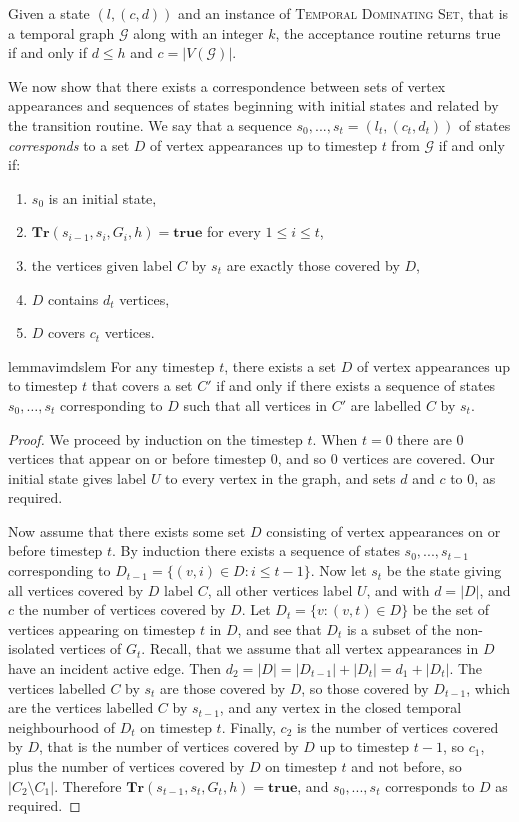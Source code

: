 \documentclass[a4paper,UKenglish,cleveref, autoref, thm-restate]{lipics-v2021} %
\begin{document}
\begin{toappendix}
Given a state $(l, (c, d))$ and an instance of \textsc{Temporal Dominating Set}, that is a temporal graph $\mathcal{G}$ along with an integer $k$, the acceptance routine returns true if and only if $d \leq h$ and $c = |V(\mathcal{G})|$.

We now show that there exists a correspondence between sets of vertex appearances and sequences of states beginning with initial states and related by the transition routine. We say that a sequence $s_0, ..., s_t = (l_t,(c_t,d_t))$ of states \textit{corresponds} to a set $D$ of vertex appearances up to timestep $t$ from $\mathcal{G}$ if and only if:
 \begin{enumerate}
     \item $s_0$ is an initial state,
     \item $\textbf{Tr}(s_{i-1}, s_i, G_i,h)=\textbf{true}$ for every $1 \leq i \leq t$,
     \item the vertices given label $C$ by $s_t$ are exactly those covered by $D$,
     \item $D$ contains $d_t$ vertices,
     \item $D$ covers $c_t$ vertices.
 \end{enumerate}

 \begin{restatable}{lemma}{vimdslem}
     For any timestep $t$, there exists a set $D$ of vertex appearances up to timestep $t$ that covers a set $C'$ if and only if there exists a sequence of states $s_0,\ldots,s_t$ corresponding to $D$ such that all vertices in $C'$ are labelled $C$ by $s_t$.
 \end{restatable}
 \begin{proof}
     We proceed by induction on the timestep $t$. When $t=0$ there are $0$ vertices that appear on or before timestep $0$, and so $0$ vertices are covered. Our initial state gives label $U$ to every vertex in the graph, and sets $d$ and $c$ to $0$, as required.

     Now assume that there exists some set $D$ consisting of vertex appearances on or before timestep $t$. By induction there exists a sequence of states $s_0, ..., s_{t-1}$ corresponding to $D_{t-1} = \{(v, i) \in D : i \leq t - 1\}$. Now let $s_t$ be the state giving all vertices covered by $D$ label $C$, all other vertices label $U$, and with $d = |D|$, and $c$ the number of vertices covered by $D$. Let $D_t = \{v : (v, t) \in D\}$ be the set of vertices appearing on timestep $t$ in $D$, and see that $D_t$ is a subset of the non-isolated vertices of $G_t$. Recall, that we assume that all vertex appearances in $D$ have an incident active edge. Then $d_2 = |D| = |D_{t-1}|+|D_t| = d_1+|D_t|$. The vertices labelled $C$ by $s_t$ are those covered by $D$, so those covered by $D_{t-1}$, which are the vertices labelled $C$ by $s_{t-1}$, and any vertex in the closed temporal neighbourhood of $D_t$ on timestep $t$. Finally, $c_2$ is the number of vertices covered by $D$, that is the number of vertices covered by $D$ up to timestep $t-1$, so $c_1$, plus the number of vertices covered by $D$ on timestep $t$ and not before, so $|C_2 \setminus C_1|$. Therefore $\textbf{Tr}(s_{t-1}, s_t, G_t,h)=\textbf{true}$, and $s_0, ..., s_t$ corresponds to $D$ as required.


\end{proof}
\end{toappendix}
\end{document}
